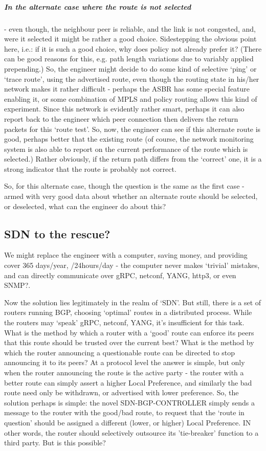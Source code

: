 \subparagraph{In the alternate case where the route is\textit{ not selected}} - even though, the neighbour
peer is reliable, and the link is not congested, and, were it selected it might
be rather a good choice.  Sidestepping the obvious point here, i.e.: if it is
such a good choice, why does policy not already prefer it? (There can be good
reasons for this, e.g. path length variations due to variably applied
prepending.)  So, the engineer might decide to do some kind of selective `ping'
or `trace route', using the advertised route, even though the routing state in
his/her network makes it rather difficult - perhaps the ASBR has some special
feature enabling it, or some combination of MPLS and policy routing allows this
kind of experiment.  Since this network is evidently rather smart, perhaps it
can also report back to the engineer which peer connection then delivers the
return packets for this `route test'.  So, now, the engineer can see if this
alternate route is good, perhaps better that the existing route (of course, the
network monitoring system is also able to report on the current performance of
the route which is selected.)
Rather obviously, if the return path differs from the `correct' one, it is a
strong indicator that the route is probably not correct.

So, for this alternate case, though the question is the same as the first case
- armed with very good data about whether
an alternate route should be selected, or deselected, what can the engineer do
about this?

\subsection{SDN to the rescue?}
We might replace the engineer with a computer, saving money, and providing cover 365 days/year, /24hours/day - the computer never makes `trivial' mistakes, and can directly communicate over gRPC, netconf, YANG, http3, or even SNMP?.

Now the solution lies legitimately in the realm of `SDN'.
But still, there is a set of routers running BGP, choosing `optimal' routes in a distributed process.
While the routers may `speak' gRPC, netconf, YANG, it's insufficient for this task.
What is the method by which a router with a `good' route can enforce its peers that this route
should be trusted over the current best?  What is the method by which the
router announcing a questionable route can be directed to stop announcing it to its
peers?
At a protocol level the answer is simple, but only when the router announcing the route is the active party - the router with a better route can simply assert a higher
Local Preference, and similarly the bad route need only be withdrawn, or
advertised with lower preference.
So, the solution perhaps is simple: the novel SDN-BGP-CONTROLLER simply sends a message to the router with the good/bad route,
to request that the `route in question' should be assigned a different (lower,
or higher) Local Preference. IN other words, the router should selectively  outsource its
'tie-breaker' function to a third party.  But is this possible?

